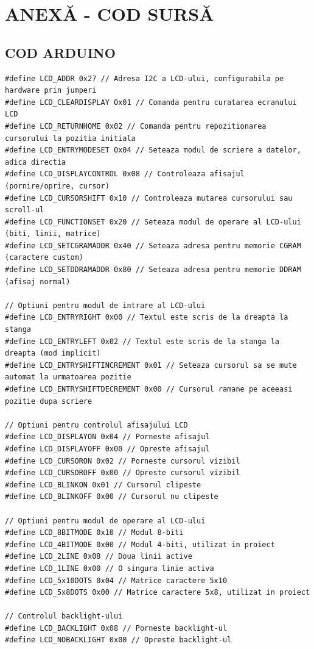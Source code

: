 \documentclass[a4paper,12pt]{report}
\begin{document}
\chapter*{ANEXĂ - COD SURSĂ}
\section{COD ARDUINO}
\begin{lstlisting}
#define LCD_ADDR 0x27 // Adresa I2C a LCD-ului, configurabila pe hardware prin jumperi
#define LCD_CLEARDISPLAY 0x01 // Comanda pentru curatarea ecranului LCD
#define LCD_RETURNHOME 0x02 // Comanda pentru repozitionarea cursorului la pozitia initiala
#define LCD_ENTRYMODESET 0x04 // Seteaza modul de scriere a datelor, adica directia
#define LCD_DISPLAYCONTROL 0x08 // Controleaza afisajul (pornire/oprire, cursor)
#define LCD_CURSORSHIFT 0x10 // Controleaza mutarea cursorului sau scroll-ul
#define LCD_FUNCTIONSET 0x20 // Seteaza modul de operare al LCD-ului (biti, linii, matrice)
#define LCD_SETCGRAMADDR 0x40 // Seteaza adresa pentru memorie CGRAM (caractere custom)
#define LCD_SETDDRAMADDR 0x80 // Seteaza adresa pentru memorie DDRAM (afisaj normal)

// Optiuni pentru modul de intrare al LCD-ului
#define LCD_ENTRYRIGHT 0x00 // Textul este scris de la dreapta la stanga
#define LCD_ENTRYLEFT 0x02 // Textul este scris de la stanga la dreapta (mod implicit)
#define LCD_ENTRYSHIFTINCREMENT 0x01 // Seteaza cursorul sa se mute automat la urmatoarea pozitie
#define LCD_ENTRYSHIFTDECREMENT 0x00 // Cursorul ramane pe aceeasi pozitie dupa scriere

// Optiuni pentru controlul afisajului LCD
#define LCD_DISPLAYON 0x04 // Porneste afisajul
#define LCD_DISPLAYOFF 0x00 // Opreste afisajul
#define LCD_CURSORON 0x02 // Porneste cursorul vizibil
#define LCD_CURSOROFF 0x00 // Opreste cursorul vizibil
#define LCD_BLINKON 0x01 // Cursorul clipeste
#define LCD_BLINKOFF 0x00 // Cursorul nu clipeste

// Optiuni pentru modul de operare al LCD-ului
#define LCD_8BITMODE 0x10 // Modul 8-biti
#define LCD_4BITMODE 0x00 // Modul 4-biti, utilizat in proiect
#define LCD_2LINE 0x08 // Doua linii active
#define LCD_1LINE 0x00 // O singura linie activa
#define LCD_5x10DOTS 0x04 // Matrice caractere 5x10
#define LCD_5x8DOTS 0x00 // Matrice caractere 5x8, utilizat in proiect

// Controlul backlight-ului
#define LCD_BACKLIGHT 0x08 // Porneste backlight-ul
#define LCD_NOBACKLIGHT 0x00 // Opreste backlight-ul


\end{lstlisting}
\end{document}
